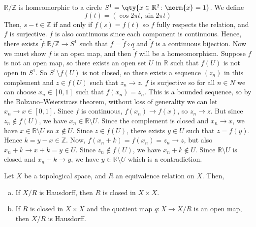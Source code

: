 \begin{example}
	\( \mathbb R / \mathbb Z \) is homeomorphic to a circle \( S^1 = \qty{x \in \mathbb R^2 \colon \norm{x} = 1} \).
	We define
	\[
		f(t) = (\cos 2 \pi t, \sin 2 \pi t)
	\]
	Then, \( s - t \in \mathbb Z \) if and only if \( f(s) = f(t) \) so \( f \) fully respects the relation, and \( f \) is surjective.
	\( f \) is also continuous since each component is continuous.
	Hence, there exists \( \widetilde f \colon \mathbb R / \mathbb Z \to S^1 \) such that \( f = \widetilde f \circ q \) and \( \widetilde f \) is a continuous bijection.
	Now we must show \( f \) is an open map, and then \( \widetilde f \) will be a homeomorphism.
	Suppose \( f \) is not an open map, so there exists an open set \( U \) in \( \mathbb R \) such that \( f(U) \) is not open in \( S^1 \).
	So \( S^1 \setminus f(U) \) is not closed, so there exists a sequence \( (z_n) \) in this complement and \( z \in f(U) \) such that \( z_n \to z \).
	\( f \) is surjective so for all \( n \in N \) we can choose \( x_n \in [0,1] \) such that \( f(x_n) = z_n \).
	This is a bounded sequence, so by the Bolzano--Weierstrass theorem, without loss of generality we can let \( x_n \to x \in [0,1] \).
	Since \( f \) is continuous, \( f(x_n) \to f(x) \), so \( z_n \to z \).
	But since \( z_n \not\in f(U) \), we have \( x_n \in \mathbb R \setminus U \).
	Since the complement is closed and \( x_n \to x \), we have \( x \in \mathbb R \setminus U \) so \( x \not\in U \).
	Since \( z \in f(U) \), there exists \( y \in U \) such that \( z = f(y) \).
	Hence \( k = y - x \in \mathbb Z \).
	Now, \( f(x_n + k) = f(x_n) = z_n \to z \), but also \( x_n + k \to x + k = y \in U \).
	Since \( z_n \not\in f(U) \), we have \( x_n + k \not\in U \).
	Since \( \mathbb R \setminus U \) is closed and \( x_n + k \to y \), we have \( y \in \mathbb R \setminus U \) which is a contradiction.
\end{example}
\begin{proposition}
	Let \( X \) be a topological space, and \( R \) an equivalence relation on \( X \).
	Then,
	\begin{enumerate}[(a)]
		\item If \( X / R \) is Hausdorff, then \( R \) is closed in \( X \times X \).
		\item If \( R \) is closed in \( X \times X \) and the quotient map \( q \colon X \to X/R \) is an open map, then \( X / R \) is Hausdorff.
	\end{enumerate}
\end{proposition}
